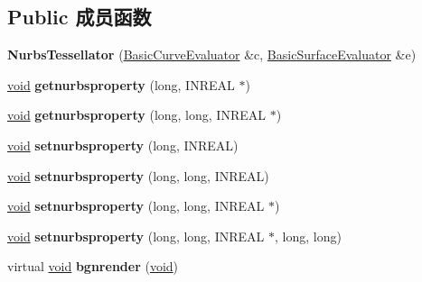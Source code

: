\subsection*{Public 成员函数}
\begin{DoxyCompactItemize}
\item 
\mbox{\label{class_nurbs_tessellator_a7c4ca96cfd7a2adf942f83194003ab95}} 
{\bfseries Nurbs\+Tessellator} (\hyperlink{class_basic_curve_evaluator}{Basic\+Curve\+Evaluator} \&c, \hyperlink{class_basic_surface_evaluator}{Basic\+Surface\+Evaluator} \&e)
\item 
\mbox{\label{class_nurbs_tessellator_a5ad864b57cedbe6939d89847dae24c42}} 
\hyperlink{interfacevoid}{void} {\bfseries getnurbsproperty} (long, I\+N\+R\+E\+AL $\ast$)
\item 
\mbox{\label{class_nurbs_tessellator_a61d5ca7e2a753962328b8c24c40a275f}} 
\hyperlink{interfacevoid}{void} {\bfseries getnurbsproperty} (long, long, I\+N\+R\+E\+AL $\ast$)
\item 
\mbox{\label{class_nurbs_tessellator_ae4e8a6ba5b68bbb32aadbcdd456604b6}} 
\hyperlink{interfacevoid}{void} {\bfseries setnurbsproperty} (long, I\+N\+R\+E\+AL)
\item 
\mbox{\label{class_nurbs_tessellator_ab938dfe5db736fe0e4641da5595af3e4}} 
\hyperlink{interfacevoid}{void} {\bfseries setnurbsproperty} (long, long, I\+N\+R\+E\+AL)
\item 
\mbox{\label{class_nurbs_tessellator_aad456801180eb63b1d46464ae2038d45}} 
\hyperlink{interfacevoid}{void} {\bfseries setnurbsproperty} (long, long, I\+N\+R\+E\+AL $\ast$)
\item 
\mbox{\label{class_nurbs_tessellator_a781eb853e640b13be78e1fedb68585ee}} 
\hyperlink{interfacevoid}{void} {\bfseries setnurbsproperty} (long, long, I\+N\+R\+E\+AL $\ast$, long, long)
\item 
\mbox{\label{class_nurbs_tessellator_a5072f6e9d0183b1460992e83f2efb40b}} 
virtual \hyperlink{interfacevoid}{void} {\bfseries bgnrender} (\hyperlink{interfacevoid}{void})

\end{DoxyCompactItemize}
